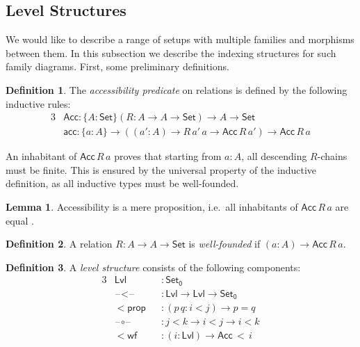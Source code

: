 \documentclass[a4paper,UKenglish,cleveref, autoref, thm-restate]{lipics-v2021}
\theoremstyle{remark}
\theoremstyle{definition}
\newtheorem{mydefinition}{Definition}
\newtheorem{mylemma}{Lemma}
\newcommand{\Set}[1]{\mathsf{Set_{#1}}}
\newcommand{\Seti}{\mathsf{Set}}
\newcommand{\blank}{\mathord{\hspace{1pt}\text{--}\hspace{1pt}}}
\newcommand{\mi}[1]{\mathit{#1}}
\newcommand{\Acc}{\mathsf{Acc}}
\newcommand{\acc}{\mathsf{acc}}
\newcommand{\Lvl}{\mathsf{Lvl}}
\begin{document}
\subsection{Level Structures}
\label{sec:level_structures}

We would like to describe a range of setups with multiple families and morphisms
between them. In this subsection we describe the indexing structures for such
family diagrams. First, some preliminary definitions.

\begin{mydefinition} The \emph{accessibility predicate} on relations is defined by the following
inductive rules:
\begin{alignat*}{3}
  & \Acc : \{A : \Seti\}(R : A \to A \to \Seti) \to A \to \Seti \\
  & \acc : \{a : A\} \to ((\mi{a'} : A) \to R\,\mi{a'}\,a \to \Acc\,R\,\mi{a'}) \to \Acc\,R\,a
\end{alignat*}
\end{mydefinition}

\noindent An inhabitant of $\Acc\,R\,a$ proves that starting from $a : A$, all
descending $R$-chains must be finite. This is ensured by the universal property
of the inductive definition, as all inductive types must be well-founded.

\begin{mylemma}\label{lem:accprop}
Accessibility is a mere proposition, i.e.\ all inhabitants of $\Acc\,R\,a$ are
equal \cite[Lemma 10.3.4]{hottbook}.
\end{mylemma}

\begin{mydefinition}
A relation $R : A \to A \to \Seti$ is \emph{well-founded} if $(a : A) \to
\Acc\,R\,a$.
\end{mydefinition}


\begin{mydefinition} A \emph{level structure} consists of the following components:
\begin{alignat*}{3}
  & \Lvl                  &&: \Set0 \\
  & \blank\!<\!\blank     &&: \Lvl \to \Lvl \to \Set0 \\
  & \mathsf{<\!prop }     &&: (p\,q : i < j) \to p = q \\
  & \blank\!\circ\!\blank &&: j < k \to i < j \to i < k \\
  & \mathsf{<\!wf}        &&: (i : \Lvl) \to \Acc\,<\,i
\end{alignat*}
\end{mydefinition}
\end{document}
